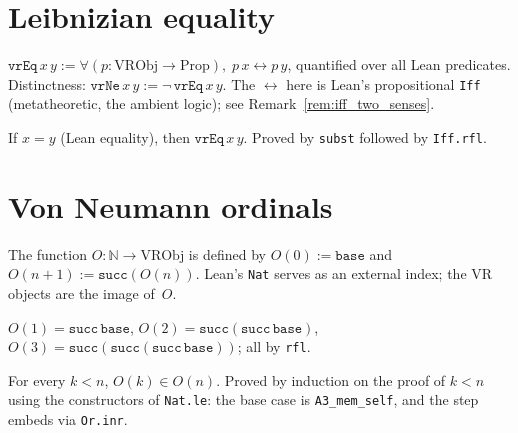 \section{Leibnizian equality}
\label{sec:vr_leibniz}

\begin{definition}
\label{def:vrEq}
\leanok
{}
$\texttt{vrEq}\,x\,y := \forall (p : \mathrm{VRObj} \to \mathrm{Prop}),\;
p\,x \leftrightarrow p\,y$, quantified over all Lean predicates.
Distinctness: $\texttt{vrNe}\,x\,y := \lnot\,\texttt{vrEq}\,x\,y$.
The $\leftrightarrow$ here is Lean's propositional \texttt{Iff}
(metatheoretic, the ambient logic); see Remark~\ref{rem:iff_two_senses}.
\end{definition}

\begin{theorem}
\label{thm:Eq_to_vrEq}
\leanok
{}
If $x = y$ (Lean equality), then $\texttt{vrEq}\,x\,y$.  Proved by
\texttt{subst} followed by \texttt{Iff.rfl}.
\end{theorem}

\section{Von Neumann ordinals}
\label{sec:vr_ordinals}

\begin{definition}
\label{def:O}
\leanok
{}
The function $O : \mathbb{N} \to \mathrm{VRObj}$ is defined by $O(0) :=
\texttt{base}$ and $O(n+1) := \texttt{succ}(O(n))$.  Lean's
\texttt{Nat} serves as an external index; the VR objects are the image
of~$O$.
\end{definition}

\begin{theorem}
\label{thm:O_concrete}
\leanok
{}
$O(1) = \texttt{succ}\,\texttt{base}$, $O(2) = \texttt{succ}(\texttt{succ}\,\texttt{base})$,
$O(3) = \texttt{succ}(\texttt{succ}(\texttt{succ}\,\texttt{base}))$; all by \texttt{rfl}.
\end{theorem}

\begin{theorem}[$O_k \in O_n$ for $k < n$]
\label{thm:O_mem_lt}
\leanok
{}
For every $k < n$, $O(k) \in O(n)$.  Proved by induction on the proof
of $k < n$ using the constructors of \texttt{Nat.le}: the base case is
\texttt{A3\_mem\_self}, and the step embeds via \texttt{Or.inr}.
\end{theorem}

